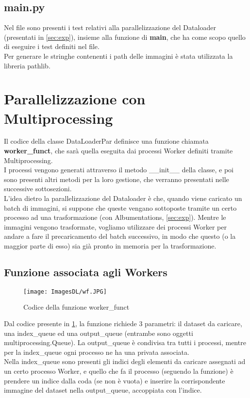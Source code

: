\documentclass[10pt,twocolumn,letterpaper]{article}
\begin{document}
\subsection{main.py}
Nel file sono presenti i test relativi alla parallelizzazione del Dataloader (presentati in \cref{sec:exp}), insieme alla funzione di \textbf{main}, che ha come scopo quello di eseguire i test definiti nel file.\\
Per generare le stringhe contenenti i path delle immagini è stata utilizzata la libreria pathlib.


\section{Parallelizzazione con Multiprocessing}
\label{sec:par}
Il codice della classe DataLoaderPar definisce una funzione chiamata \textbf{worker\_funct}, che sarà quella eseguita dai processi Worker definiti tramite Multiprocessing.\\
I processi vengono generati attraverso il metodo \_\_init\_\_ della classe, e poi sono presenti altri metodi per la loro gestione, che verranno presentati nelle successive sottosezioni.\\
L'idea dietro la parallelizzazione del Dataloader è che, quando viene caricato un batch di immagini, si suppone che queste vengano sottoposte tramite un certo processo ad una trasformazione (con Albumentations, \cref{sec:exp}). Mentre le immagini vengono trasformate, vogliamo utilizzare dei processi Worker per andare a fare il precaricamento del batch successivo, in modo che questo (o la maggior parte di esso) sia già pronto in memoria per la trasformazione.

\subsection{Funzione associata agli Workers}
\label{sec:fw}

\begin{figure}[h]
    \centering
    \texttt{[image: ImagesDL/wf.JPG]}
    \caption{Codice della funzione worker\_funct}
    \label{fig:wf}
\end{figure}

Dal codice presente in \cref{fig:wf}, la funzione richiede 3 parametri: il dataset da caricare, una index\_queue ed una output\_queue (entrambe sono oggetti multiprocessing.Queue). La output\_queue è condivisa tra tutti i processi, mentre  per la index\_queue ogni processo ne ha una privata associata.\\
Nella index\_queue sono presenti gli indici degli elementi da caricare assegnati ad un certo processo Worker, e quello che fa il processo (seguendo la funzione) è prendere un indice dalla coda (se non è vuota) e inserire la corrispondente immagine del dataset nella output\_queue, accoppiata con l'indice.
\end{document}
